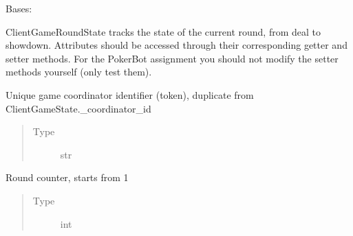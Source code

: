 \documentclass[letterpaper,10pt,english]{sphinxmanual}
\begin{document}
\begin{fulllineitems}
\label{\detokenize{client:client.state.ClientGameRoundState}}
\pysigstartsignatures
{}
\pysigstopsignatures
\sphinxAtStartPar
Bases: 

\sphinxAtStartPar
ClientGameRoundState tracks the state of the current round, from deal to showdown. Attributes should be accessed
through their corresponding getter and setter methods. For the PokerBot assignment you should not modify the setter
methods yourself (only test them).

\begin{fulllineitems}
\label{\detokenize{client:client.state.ClientGameRoundState._coordinator_id}}
\pysigstartsignatures
{}
\pysigstopsignatures
\sphinxAtStartPar
Unique game coordinator identifier (token), duplicate from ClientGameState.\_coordinator\_id
\begin{quote}\begin{description}
\item[{Type}] \leavevmode
\sphinxAtStartPar
str

\end{description}\end{quote}

\end{fulllineitems}


\begin{fulllineitems}
\label{\detokenize{client:client.state.ClientGameRoundState._round_id}}
\pysigstartsignatures
{}
\pysigstopsignatures
\sphinxAtStartPar
Round counter, starts from 1
\begin{quote}\begin{description}
\item[{Type}] \leavevmode
\sphinxAtStartPar
int

\end{description}\end{quote}


\end{fulllineitems}
\end{fulllineitems}
\end{document}
